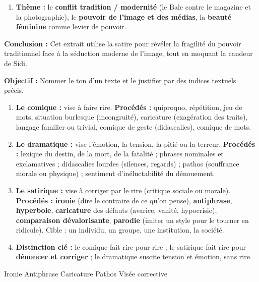 \documentclass[11pt]{article}
\newcommand{\cle}[1]{{\popxbold\color{popdark}#1}}
\begin{document}
\begin{exoresolu}
\begin{enumerate}
    \item \textbf{Thème :} le \textbf{conflit tradition / modernité} (le Bale contre le magazine et la photographie), le \textbf{pouvoir de l'image et des médias}, la \textbf{beauté féminine} comme levier de pouvoir.
\end{enumerate}
\textbf{Conclusion :} Cet extrait utilise la satire pour révéler la fragilité du pouvoir traditionnel face à la séduction moderne de l'image, tout en moquant la candeur de Sidi.
\end{exoresolu}

\begin{methode}
\textbf{Objectif :} Nommer le ton d'un texte et le justifier par des indices textuels précis.
\begin{enumerate}
    \item \textbf{Le comique :} vise à faire rire. \textbf{Procédés :} quiproquo, répétition, jeu de mots, situation burlesque (incongruité), caricature (exagération des traits), langage familier ou trivial, comique de geste (didascalies), comique de mots.
    \item \textbf{Le dramatique :} vise l'émotion, la tension, la pitié ou la terreur. \textbf{Procédés :} lexique du destin, de la mort, de la fatalité ; phrases nominales et exclamatives ; didascalies lourdes (silences, regards) ; pathos (souffrance morale ou physique) ; sentiment d'inéluctabilité du dénouement.
    \item \textbf{Le satirique :} vise à corriger par le rire (critique sociale ou morale). \textbf{Procédés :} \textbf{ironie} (dire le contraire de ce qu'on pense), \textbf{antiphrase}, \textbf{hyperbole}, \textbf{caricature} des défauts (avarice, vanité, hypocrisie), \textbf{comparaison dévalorisante}, \textbf{parodie} (imiter un style pour le tourner en ridicule). Cible : un individu, un groupe, une institution, la société.
    \item \textbf{Distinction clé :} le comique fait rire pour rire ; le satirique fait rire pour \textbf{dénoncer et corriger} ; le dramatique suscite tension et émotion, sans rire.
\end{enumerate}
\cle{Ironie} \cle{Antiphrase} \cle{Caricature} \cle{Pathos} \cle{Visée corrective}
\end{methode}
\end{document}
